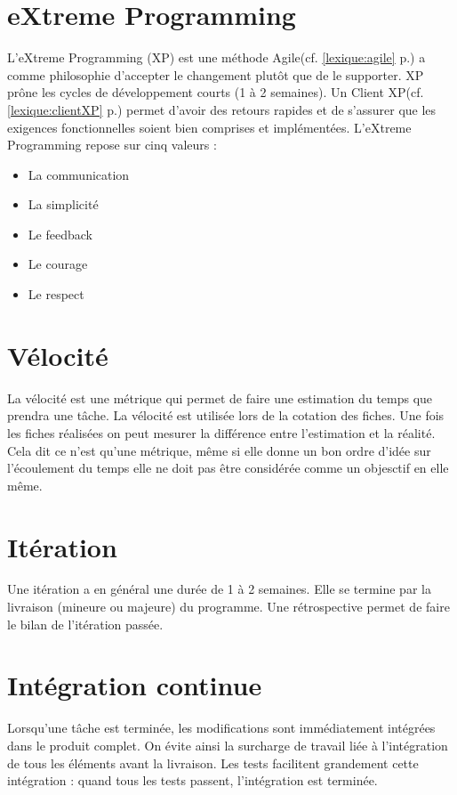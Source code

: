 \section{eXtreme Programming}\label{lexique:XP}
L'eXtreme Programming (XP) est une méthode Agile(cf. \ref{lexique:agile} p.\pageref{lexique:agile}) a comme philosophie d'accepter le changement plutôt que de le supporter. XP prône les cycles de développement courts (1 à 2 semaines). Un Client XP(cf. \ref{lexique:clientXP} p.\pageref{lexique:clientXP}) permet d'avoir des retours rapides et de s'assurer que les exigences fonctionnelles soient bien comprises et implémentées. L'eXtreme Programming repose sur cinq valeurs :
\begin{itemize}
\item{La communication}
\item{La simplicité}
\item{Le feedback}
\item{Le courage}
\item{Le respect}
\end{itemize}

\section{Vélocité}\label{lexique:velocité}
La vélocité est une métrique qui permet de faire une estimation du temps que prendra une tâche. La vélocité est utilisée lors de la cotation des fiches. Une fois les fiches réalisées on peut mesurer la différence entre l'estimation et la réalité. Cela dit ce n'est qu'une métrique, même si elle donne un bon ordre d'idée sur l'écoulement du temps elle ne doit pas être considérée comme un objesctif en elle même.

\section{Itération}
Une itération a en général une durée de 1 à 2 semaines. Elle se termine par la livraison (mineure ou majeure) du programme. Une rétrospective permet de faire le bilan de l'itération passée.

\section{Intégration continue}\label{lexique:integrationContinue}
Lorsqu'une tâche est terminée, les modifications sont immédiatement intégrées dans le produit complet. On évite ainsi la surcharge de travail liée à l'intégration de tous les éléments avant la livraison. Les tests facilitent grandement cette intégration : quand tous les tests passent, l'intégration est terminée. 

